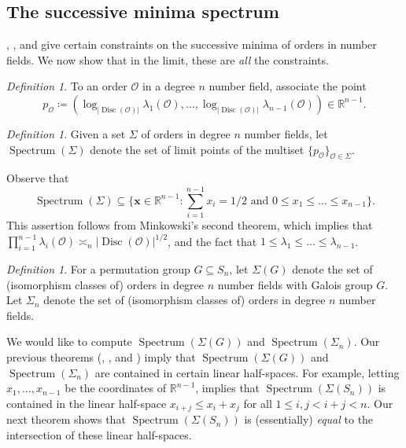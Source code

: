 \documentclass[letterpaper,10pt]{amsart}
\DeclareMathOperator{\Spe}{Spectrum}
\DeclareMathOperator{\Disc}{Disc}
\newcommand{\RR}{\mathbb{R}}      %
\newcommand{\cO}{\mathcal{O}}      %
\theoremstyle{definition}
\theoremstyle{remark}
\newtheorem{definition}[theorem]{Definition}
\begin{document}
\subsection{The successive minima spectrum}
, , and  give certain constraints on the successive minima of orders in number fields. We now show that in the limit, these are \emph{all} the constraints. 

\begin{definition}
\label{def:po}
To an order $\cO$ in a degree $n$ number field, associate the point 
\[
	p_{\cO} \coloneqq (\log_{ \lvert \Disc(\cO) \rvert }\lambda_{1}(\cO),\dots,\log_{ \lvert \Disc(\cO) \rvert }\lambda_{n-1}(\cO)) \in \RR^{n-1}.
\]
\end{definition}

\begin{definition}
\label{def:spectrum}
Given a set $\Sigma$ of orders in degree $n$ number fields, let $\Spe(\Sigma)$ denote the set of limit points of the multiset $\{p_{\cO}\}_{\cO \in \Sigma}$.
\end{definition}

\noindent Observe that
\begin{equation*}
\label{eqn:basic-constraint}
\Spe(\Sigma) \subseteq \{\mathbf{x} \in \RR^{n-1} : \sum_{i=1}^{n-1}x_i = 1/2 \text{ and } 0 \leq x_1 \leq \dots \leq x_{n-1}\}.
\end{equation*}
This assertion follows from Minkowski's second theorem, which implies that $\prod_{i = 1}^{n-1} \lambda_i(\cO) \asymp_n \lvert \Disc(\cO) \rvert^{1/2}$, and the fact that $1 \leq \lambda_1 \leq \dots \leq \lambda_{n-1}$.

\begin{definition}
\label{def:sigma-g}
For a permutation group $G \subseteq S_n$, let $\Sigma(G)$ denote the set of (isomorphism classes of) orders in degree $n$ number fields with Galois group $G$. Let $\Sigma_n$ denote the set of (isomorphism classes of) orders in degree $n$ number fields.     
\end{definition}

We would like to compute $\Spe(\Sigma(G))$ and $\Spe(\Sigma_n)$. Our previous theorems (, , and ) imply that $\Spe(\Sigma(G))$ and $\Spe(\Sigma_n)$ are contained in certain linear half-spaces. For example, letting $x_1,\dots,x_{n-1}$ be the coordinates of $\RR^{n-1}$,  implies that $\Spe(\Sigma(S_n))$ is contained in the linear half-space $x_{i+j} \leq x_i + x_j$ for all $1 \leq i,j < i+j < n$. Our next theorem shows that $\Spe(\Sigma(S_n))$ is (essentially) \emph{equal} to the intersection of these linear half-spaces. 
\end{document}
